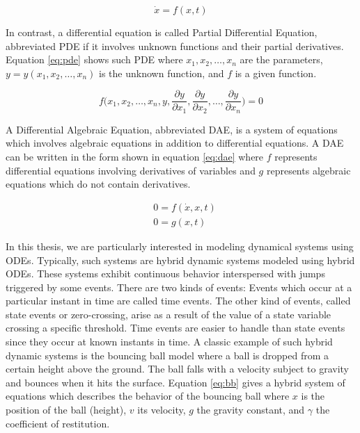 \begin{equation}
\dot{x} = f(x,t)
\label{eq:ode}
\end{equation}

In contrast, a differential equation is called Partial Differential Equation, abbreviated PDE if it involves unknown functions and their partial derivatives. Equation \ref{eq:pde} shows such PDE where $x_1,x_2,\dots, x_n$ are the parameters, $y=y(x_1,x_2,\dots, x_n)$ is the unknown function, and $f$ is a given function.

\begin{equation}
f\biggl(x_1,x_2,\dots, x_n,y,\frac{\partial y}{\partial x_1},\frac{\partial y}{\partial x_2},\dots,\frac{\partial y}{\partial x_n}\biggl)=0
\label{eq:pde}
\end{equation} 

A Differential Algebraic Equation, abbreviated DAE, is a system of equations which involves algebraic equations in addition to differential equations. A DAE can be written in the form shown in equation \ref{eq:dae} where $f$ represents differential equations involving derivatives of variables and $g$ represents algebraic equations which do not contain derivatives.

\begin{equation}
\begin{aligned}
&0 = f(\dot{x},x,t)\\
&0 = g(x,t)
\end{aligned}
\label{eq:dae}
\end{equation} 
  
In this thesis, we are particularly interested in modeling dynamical systems using ODEs. Typically, such systems are hybrid dynamic systems modeled using hybrid ODEs. These systems exhibit continuous behavior interspersed with jumps triggered by some events. There are two kinds of events: Events which occur at a particular instant in time are called time events. The other kind of events, called state events or zero-crossing, arise as a result of the value of a state variable crossing a specific threshold. Time events are easier to handle than state events since they occur at known instants in time. A classic example of such hybrid dynamic systems is the bouncing ball model where a ball is dropped from a certain height above the ground. The ball falls with a velocity subject to gravity and bounces when it hits the surface. Equation \ref{eq:bb} gives a hybrid system of equations which describes the behavior of the bouncing ball where $x$ is the position of the ball (height), $v$ its velocity, $g$ the gravity constant, and $\gamma$ the coefficient of restitution.

